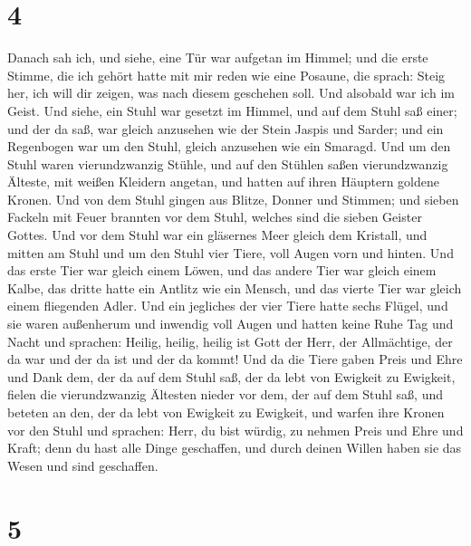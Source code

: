 \hypertarget{section-3}{%
\section{4}\label{section-3}}

 Danach sah ich, und siehe, eine Tür war aufgetan im
Himmel; und die erste Stimme, die ich gehört hatte mit mir reden wie
eine Posaune, die sprach: Steig her, ich will dir zeigen, was nach
diesem geschehen soll.  Und alsobald war ich im Geist. Und
siehe, ein Stuhl war gesetzt im Himmel, und auf dem Stuhl saß einer;
 und der da saß, war gleich anzusehen wie der Stein Jaspis
und Sarder; und ein Regenbogen war um den Stuhl, gleich anzusehen wie
ein Smaragd.  Und um den Stuhl waren vierundzwanzig
Stühle, und auf den Stühlen saßen vierundzwanzig Älteste, mit weißen
Kleidern angetan, und hatten auf ihren Häuptern goldene Kronen.
 Und von dem Stuhl gingen aus Blitze, Donner und Stimmen;
und sieben Fackeln mit Feuer brannten vor dem Stuhl, welches sind die
sieben Geister Gottes.  Und vor dem Stuhl war ein
gläsernes Meer gleich dem Kristall, und mitten am Stuhl und um den Stuhl
vier Tiere, voll Augen vorn und hinten.  Und das erste
Tier war gleich einem Löwen, und das andere Tier war gleich einem Kalbe,
das dritte hatte ein Antlitz wie ein Mensch, und das vierte Tier war
gleich einem fliegenden Adler.  Und ein jegliches der vier
Tiere hatte sechs Flügel, und sie waren außenherum und inwendig voll
Augen und hatten keine Ruhe Tag und Nacht und sprachen: Heilig, heilig,
heilig ist Gott der Herr, der Allmächtige, der da war und der da ist und
der da kommt!  Und da die Tiere gaben Preis und Ehre und
Dank dem, der da auf dem Stuhl saß, der da lebt von Ewigkeit zu
Ewigkeit,  fielen die vierundzwanzig Ältesten nieder vor
dem, der auf dem Stuhl saß, und beteten an den, der da lebt von Ewigkeit
zu Ewigkeit, und warfen ihre Kronen vor den Stuhl und sprachen:
 Herr, du bist würdig, zu nehmen Preis und Ehre und
Kraft; denn du hast alle Dinge geschaffen, und durch deinen Willen haben
sie das Wesen und sind geschaffen.

\hypertarget{section-4}{%
\section{5}\label{section-4}}

